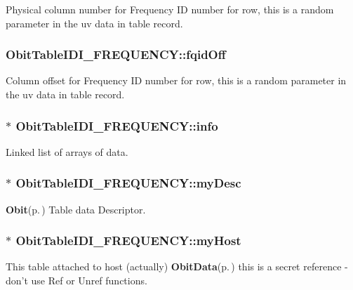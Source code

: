 Physical column number for Frequency ID number for row, this is a random parameter in the uv data in table record. 

\subsubsection{ {\bf Obit\-Table\-IDI\_\-FREQUENCY::fqid\-Off}}\label{structObitTableIDI__FREQUENCY_o26}


Column offset for Frequency ID number for row, this is a random parameter in the uv data in table record. 

\subsubsection{$\ast$ {\bf Obit\-Table\-IDI\_\-FREQUENCY::info}}\label{structObitTableIDI__FREQUENCY_o5}


Linked list of arrays of data. 

\subsubsection{$\ast$ {\bf Obit\-Table\-IDI\_\-FREQUENCY::my\-Desc}}\label{structObitTableIDI__FREQUENCY_o8}


{\bf Obit}{\rm (p.\,\pageref{structObit})} Table data Descriptor. 

\subsubsection{$\ast$ {\bf Obit\-Table\-IDI\_\-FREQUENCY::my\-Host}}\label{structObitTableIDI__FREQUENCY_o14}


This table attached to host (actually) {\bf Obit\-Data}{\rm (p.\,\pageref{structObitData})} this is a secret reference - don't use Ref or Unref functions. 

